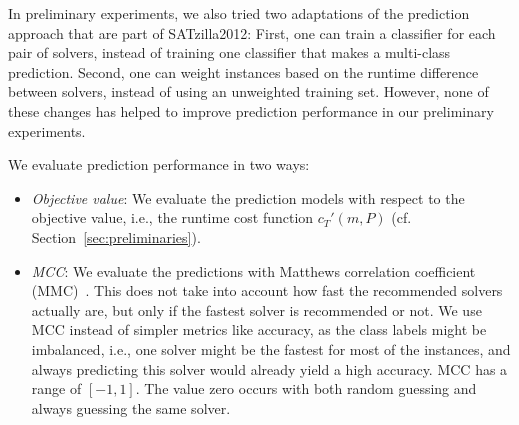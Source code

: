 \documentclass[conference]{IEEEtran}
\begin{document}
In preliminary experiments, we also tried two adaptations of the prediction approach that are part of SATzilla2012:
First, one can train a classifier for each pair of solvers, instead of training one classifier that makes a multi-class prediction.
Second, one can weight instances based on the runtime difference between solvers, instead of using an unweighted training set.
However, none of these changes has helped to improve prediction performance in our preliminary experiments.

We evaluate prediction performance in two ways:

\begin{itemize}
	\item \emph{Objective value}:
	We evaluate the prediction models with respect to the objective value, i.e., the runtime cost function $c_{T}'(m,P)$ (cf. Section~\ref{sec:preliminaries}). 
	\item \emph{MCC}:
	We evaluate the predictions with Matthews correlation coefficient (MMC)~\cite{matthews1975comparison, gorodkin2004comparing}.
	This does not take into account how fast the recommended solvers actually are, but only if the fastest solver is recommended or not.
	We use MCC instead of simpler metrics like accuracy, as the class labels might be imbalanced, i.e., one solver might be the fastest for most of the instances, and always predicting this solver would already yield a high accuracy.
	MCC has a range of $[-1,1]$. 
	The value zero occurs with both random guessing and always guessing the same solver.
\end{itemize}
\end{document}
